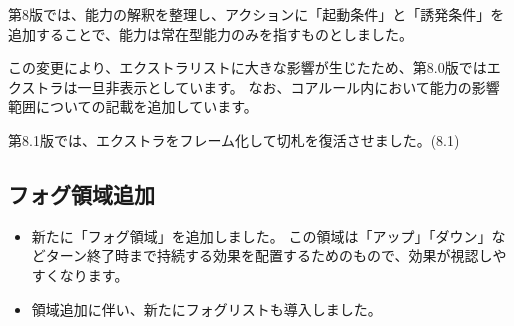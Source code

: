 \documentclass[letterpaper,10pt,dvipdfmx]{sphinxmanual}
\begin{document}
\sphinxAtStartPar
第8版では、能力の解釈を整理し、アクションに「起動条件」と「誘発条件」を追加することで、能力は常在型能力のみを指すものとしました。

\sphinxAtStartPar
この変更により、エクストラリストに大きな影響が生じたため、第8.0版ではエクストラは一旦非表示としています。 なお、コアルール内において能力の影響範囲についての記載を追加しています。

\sphinxAtStartPar
第8.1版では、エクストラをフレーム化して切札を復活させました。(8.1)


\subsection{フォグ領域追加}
\label{\detokenize{revision-history/8th:id4}}\begin{itemize}
\item {} 
\sphinxAtStartPar
新たに「フォグ領域」を追加しました。
この領域は「アップ」「ダウン」などターン終了時まで持続する効果を配置するためのもので、効果が視認しやすくなります。

\item {} 
\sphinxAtStartPar
領域追加に伴い、新たにフォグリストも導入しました。

\end{itemize}
\end{document}
